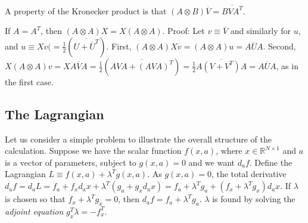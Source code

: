 \documentclass[10pt,fleqn]{article}
\renewcommand{\vec}[1]{\ensuremath{\overline{#1}}}
\begin{document}
A property of the Kronecker product is that $(A \otimes B) \vec{V} = \vec{B V
  A^T}$.

If $A = A^T$, then $(A \otimes A) X = X (A \otimes A)$. Proof: Let $v \equiv
\vec V$ and similarly for $u$, and $u \equiv X v (= \frac{1}{2} (\vec{U + \vec
  U^T})$. First, $(A \otimes A) X v = (A \otimes A) u = \vec{A U A}$. Second, $X
(A \otimes A) v = X \vec{A V A} = \frac{1}{2}(\vec{A V A + (A V A)^T}) =
\frac{1}{2}\vec{A (V + V^T) A} = \vec{A U A}$, as in the first case.

\subsection{The Lagrangian}
Let us consider a simple problem to illustrate the overall structure of the
calculation. Suppose we have the scalar function $f(x,a)$, where $x \in
\mathbb{R}^{N \times 1}$ and $a$ is a vector of parameters, subject to $g(x,a) =
0$ and we want $d_a f$. Define the Lagrangian $L \equiv f(x,a) + \lambda^T
g(x,a)$. As $g(x,a) = 0$, the total derivative $d_a f = d_a L = f_a + f_x d_a x
+ \lambda^T (g_a + g_x d_a x) = f_a + \lambda^T g_a + (f_x + \lambda^T g_x) d_a
x$. If $\lambda$ is chosen so that $f_x + \lambda^T g_x = 0$, then $d_a f = f_a
+ \lambda^T g_a$. $\lambda$ is found by solving the \emph{adjoint equation}
$g_x^T \lambda = -f_x^T$.
\end{document}
